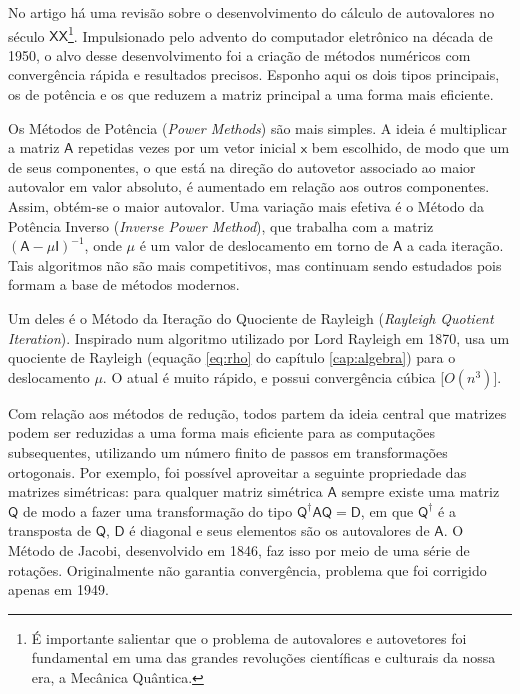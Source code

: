 	No artigo \cite{autovaloresSecXX} há uma revisão sobre o desenvolvimento do cálculo de autovalores no século $\mathsf{XX}$\footnote{É importante salientar que o problema de autovalores e autovetores foi fundamental em uma das grandes revoluções científicas e culturais da nossa era, a Mecânica Quântica.}. Impulsionado pelo advento do computador eletrônico na década de 1950, o alvo desse desenvolvimento foi a criação de métodos numéricos com convergência rápida e resultados precisos. Esponho aqui os dois tipos principais, os de potência e os que reduzem a matriz principal a uma forma mais eficiente.
	
	Os Métodos de Potência (\emph{Power Methods}) são mais simples. A ideia é multiplicar a matriz $\mathsf{A}$ repetidas vezes por um vetor inicial $\mathsf{x}$ bem escolhido, de modo que um de seus componentes, o que está na direção do autovetor associado ao maior autovalor em valor absoluto, é aumentado em relação aos outros componentes. Assim, obtém-se o maior autovalor. Uma variação mais efetiva é o Método da Potência Inverso (\emph{Inverse Power Method}), que trabalha com a matriz $(\mathsf{A} - \mu \mathsf{I})^{-1}$, onde $\mu$ é um valor de deslocamento em torno de $\mathsf{A}$ a cada iteração. Tais algoritmos não são mais competitivos, mas continuam sendo estudados pois formam a base de métodos modernos.
	
	Um deles é o Método da Iteração do Quociente de Rayleigh (\emph{Rayleigh Quotient Iteration}). Inspirado num algoritmo utilizado por Lord Rayleigh em 1870, usa um quociente de Rayleigh (equação \ref{eq:rho} do capítulo \ref{cap:algebra}) para o deslocamento $\mu$. O atual é muito rápido, e possui convergência cúbica [$O(n^3)$].
		
	Com relação aos métodos de redução, todos partem da ideia central que matrizes podem ser reduzidas a uma forma mais eficiente para as computações subsequentes, utilizando um número finito de passos em transformações ortogonais. Por exemplo, foi possível aproveitar a seguinte propriedade das matrizes simétricas: para qualquer matriz simétrica $\mathsf{A}$ sempre existe uma matriz $\mathsf{Q}$ de modo a fazer uma transformação do tipo $\mathsf{Q}^{\dag} \mathsf{A} \mathsf{Q} = \mathsf{D}$, em que $\mathsf{Q}^{\dag}$ é a transposta de $\mathsf{Q}$, $\mathsf{D}$ é diagonal e seus elementos são os autovalores de $\mathsf{A}$. O Método de Jacobi, desenvolvido em 1846, faz isso por meio de uma série de rotações. Originalmente não garantia convergência, problema que foi corrigido apenas em 1949.
	
